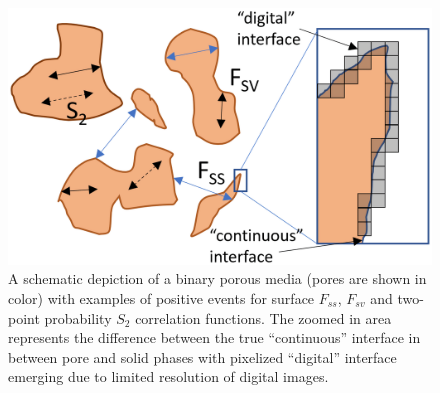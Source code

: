 \documentclass[reprint,amsmath,amssymb,aps,pre,showkeys,showpacs]{revtex4-1}
\begin{document}
\begin{figure}[ht]
  \centering
  \includegraphics[width=\linewidth]{images/scheme.png}
  \caption[]{A schematic depiction of a binary porous media (pores are shown in
    color) with examples of positive events for surface $F_{ss}$, $F_{sv}$ and
    two-point probability $S_2$ correlation functions. The zoomed in area
    represents the difference between the true ``continuous'' interface in
    between pore and solid phases with pixelized ``digital'' interface emerging
    due to limited resolution of digital images.}
  \label{fig:scheme}
\end{figure}
\end{document}
